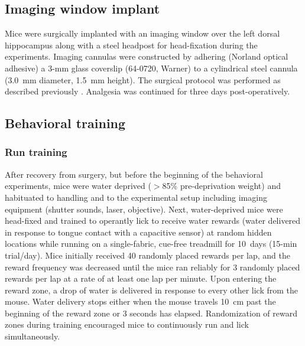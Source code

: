 \subsection{Imaging window implant}

Mice were surgically implanted with an imaging window over the left dorsal hippocampus along with a steel headpost for head-fixation during the experiments. Imaging cannulas were constructed by adhering (Norland optical adhesive) a 3-mm glass coverslip (64-0720, Warner) to a cylindrical steel cannula (3.0~mm diameter, 1.5~mm height).  The surgical protocol was performed as described previously \citep{Kaifosh2013, Lovett-Barron2014, Danielson2016b}. Analgesia was continued for three days post-operatively.

\subsection{Behavioral training}\label{sec:df:methods:training}
\subsubsection{Run training}
After recovery from surgery, but before the beginning of the behavioral experiments, mice were water deprived ($>$85\% pre-deprivation weight) and habituated to handling and to the experimental setup including imaging equipment (shutter sounds, laser, objective). Next, water-deprived mice were head-fixed and trained to operantly lick to receive water rewards (water delivered in response to tongue contact with a capacitive sensor) at random hidden locations while running on a single-fabric, cue-free treadmill for 10~days (15-min trial/day). Mice initially received 40 randomly placed rewards per lap, and the reward frequency was decreased until the mice ran reliably for 3 randomly placed rewards per lap at a rate of at least one lap per minute. Upon entering the reward zone, a drop of water is delivered in response to every other lick from the mouse. Water delivery stops either when the mouse travels 10~cm past the beginning of the reward zone or 3 seconds has elapsed. Randomization of reward zones during training encouraged mice to continuously run and lick simultaneously.
